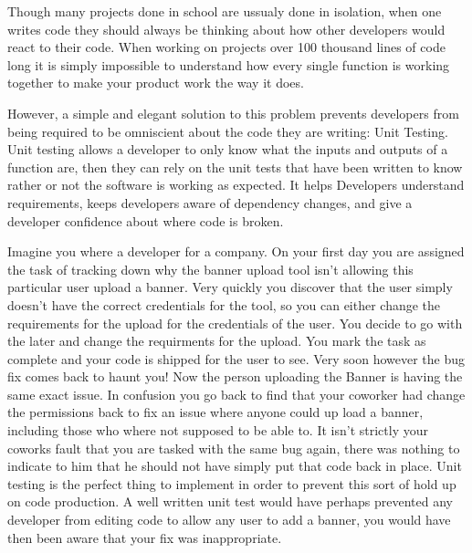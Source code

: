 

Though many projects done in school are ussualy done in isolation, when one writes code they should always be thinking about how other developers would react to their code.
When working on projects over 100 thousand lines of code long it is simply impossible to understand how every single function is working together to make your product work the way it does.

However, a simple and elegant solution to this problem prevents developers from being required to be omniscient about the code they are writing: Unit Testing.
Unit testing allows a developer to only know what the inputs and outputs of a function are, then they can rely on the unit tests that have been written to know rather or not the software is working as expected.
It helps Developers understand requirements, keeps developers aware of dependency changes, and give a developer confidence about where code is broken.

Imagine you where a developer for a company. On your first day you are assigned the task of tracking down why the banner upload tool isn't allowing this particular user upload a banner.
Very quickly you discover that the user simply doesn't have the correct credentials for the tool, so you can either change the requirements for the upload for the credentials of the user.
You decide to go with the later and change the requirments for the upload. You mark the task as complete and your code is shipped for the user to see.
Very soon however the bug fix comes back to haunt you! Now the person uploading the Banner is having the same exact issue.
In confusion you go back to find that your coworker had change the permissions back to fix an issue where anyone could up load a banner, including those who where not supposed to be able to.
It isn't strictly your coworks fault that you are tasked with the same bug again, there was nothing to indicate to him that he should not have simply put that code back in place.
Unit testing is the perfect thing to implement in order to prevent this sort of hold up on code production.
A well written unit test would have perhaps prevented any developer from editing code to allow any user to add a banner, you would have then been aware that your fix was inappropriate.

